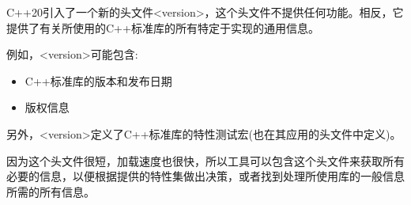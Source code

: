 C++20引入了一个新的头文件<version>，这个头文件不提供任何功能。相反，它提供了有关所使用的C++标准库的所有特定于实现的通用信息。

例如，<version>可能包含:

\begin{itemize}
\item 
C++标准库的版本和发布日期

\item 
版权信息
\end{itemize}


另外，<version>定义了C++标准库的特性测试宏(也在其应用的头文件中定义)。

因为这个头文件很短，加载速度也很快，所以工具可以包含这个头文件来获取所有必要的信息，以便根据提供的特性集做出决策，或者找到处理所使用库的一般信息所需的所有信息。







